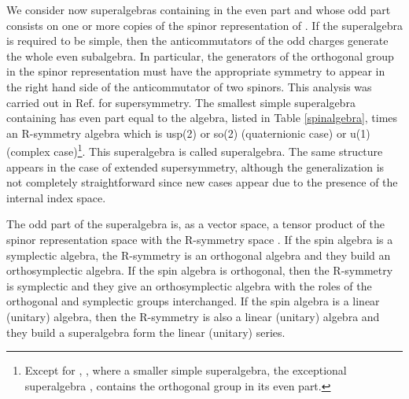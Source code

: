 \documentclass[a4paper,12pt]{article}
\begin{document}
We consider now superalgebras containing \coordHE{} in the
even part and  whose odd part  consists on one or more copies of
the spinor representation of \coordHE{}. If the superalgebra
is required to be simple, then the anticommutators of the odd
charges generate the whole even subalgebra. In particular, the
generators of the orthogonal group in the spinor representation
must have the appropriate symmetry to appear in the right hand
side of the anticommutator of two spinors. This analysis was
carried out in Ref. \cite{dflv} for \coordHE{} supersymmetry. The
smallest simple superalgebra containing \coordHE{} has even
part equal to the \coordHE{} algebra, listed in Table
\ref{spinalgebra}, times an R-symmetry algebra which is  usp(2) or
so\myHighlight{$^*$}\coordHE{}(2) (quaternionic case) or u(1) (complex
case)\footnote{Except for \coordHE{}, \coordHE{}, where a smaller simple
superalgebra, the exceptional superalgebra \coordHE{}, contains the
orthogonal group in its even part.}. This superalgebra is called
\coordHE{} superalgebra. The same structure appears in the
case of extended supersymmetry, although the generalization is not
completely straightforward since new cases appear due to the
presence of the internal index space.

The odd part of the superalgebra is, as a vector space, a tensor
product \coordHE{} of the spinor representation space \coordHE{}  with
the R-symmetry space \coordHE{}. If the spin algebra is a symplectic
algebra, the R-symmetry is an orthogonal algebra and they build an
orthosymplectic algebra. If the spin algebra is orthogonal, then
the R-symmetry is symplectic and they give an orthosymplectic
algebra with the roles of the orthogonal and symplectic groups
interchanged. If the spin algebra is a linear (unitary) algebra,
then the R-symmetry is also a linear (unitary) algebra and they
build a superalgebra form the linear (unitary) series.
\end{document}
